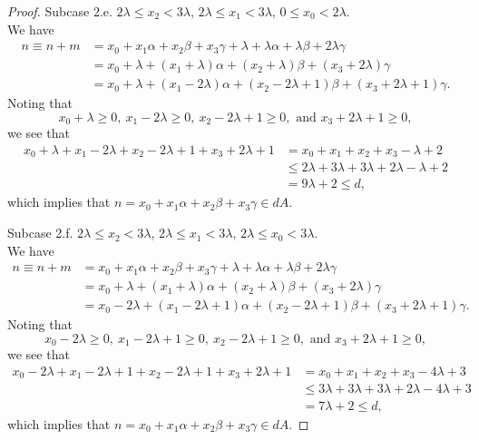 \begin{proof}
Subcase 2.e. $2\lambda \leq x_2 < 3 \lambda$, $ 2\lambda \leq x_1 < 3\lambda$,  $0 \leq x_0 < 2\lambda$. \\
We have
\begin{align*}
n \equiv n + m &= x_0 + x_1\alpha + x_2\beta + x_3\gamma + \lambda + \lambda \alpha + \lambda \beta + 2 \lambda \gamma\\
&=  x_0 + \lambda + (x_1 + \lambda) \alpha + (x_2 + \lambda) \beta + (x_3 + 2 \lambda) \gamma\\ 
&=  x_0 +  \lambda + (x_1 - 2 \lambda) \alpha + (x_2 - 2 \lambda + 1) \beta + (x_3 + 2 \lambda + 1)\gamma.
\end{align*}
Noting that
\[  x_0 +  \lambda \geq 0,  \ x_1 - 2 \lambda \geq 0, \  x_2 - 2 \lambda + 1 \geq 0, \text{ and } x_3 + 2 \lambda + 1 \geq 0, \]
we see that 
\begin{align*}
x_0 + \lambda + x_1 - 2 \lambda + x_2  - 2 \lambda + 1 + x_3 + 2 \lambda + 1 &= x_0  + x_1 +  x_2 + x_3 -  \lambda + 2 \\
&\leq 2 \lambda + 3 \lambda + 3 \lambda + 2\lambda -  \lambda + 2\\
&= 9 \lambda + 2 \leq d,
\end{align*}
which implies that $n = x_0 + x_1\alpha + x_2\beta + x_3\gamma \in dA$. 

Subcase 2.f. $2\lambda \leq x_2 < 3 \lambda$, $ 2\lambda \leq x_1 < 3\lambda$,  $2\lambda \leq x_0 < 3\lambda$. \\
We have
\begin{align*}
n \equiv n + m &= x_0 + x_1\alpha + x_2\beta + x_3\gamma + \lambda + \lambda \alpha + \lambda \beta + 2 \lambda \gamma\\
&=  x_0 + \lambda + (x_1 + \lambda) \alpha + (x_2 + \lambda) \beta + (x_3 + 2 \lambda) \gamma\\ 
&=  x_0 -  2\lambda + (x_1 - 2 \lambda + 1) \alpha + (x_2 - 2 \lambda + 1) \beta + (x_3 + 2 \lambda + 1)\gamma.
\end{align*}
Noting that
\[  x_0 -  2\lambda \geq 0,  \ x_1 - 2 \lambda + 1 \geq 0, \  x_2 - 2 \lambda + 1 \geq 0, \text{ and } x_3 + 2 \lambda + 1 \geq 0, \]
we see that 
\begin{align*}
x_0 -  2\lambda + x_1 - 2 \lambda + 1 + x_2  - 2 \lambda + 1 + x_3 + 2 \lambda + 1 &= x_0  + x_1 +  x_2 + x_3 -  4 \lambda + 3 \\
&\leq 3 \lambda + 3 \lambda + 3 \lambda + 2\lambda - 4 \lambda + 3\\
&= 7 \lambda + 2 \leq d,
\end{align*}
which implies that $n = x_0 + x_1\alpha + x_2\beta + x_3\gamma \in dA$. 


\end{proof}
